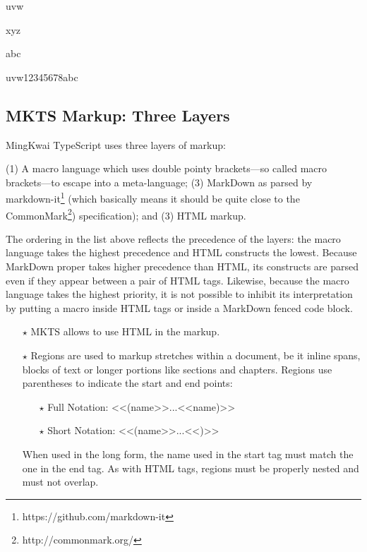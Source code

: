 

uvwxyzabc\mktsShowpar\par
uvw\mktsUp{}12345678\mktsDown{}abc\mktsShowpar\par
\begin{multicols}{2}
\subsection{MKTS Markup: Three Layers
}
MingKwai TypeScript uses three layers of markup:\mktsShowpar\par
(1) A macro language which uses double pointy brackets—so called
  macro brackets—to escape into a meta-language;
(3) MarkDown as parsed by {\mktsStyleCode{}markdown-it}\footnote{https://github.com/markdown-it}
  (which basically means it should be quite close to the
  CommonMark\footnote{http://commonmark.org/}) specification); and
(3) HTML markup.\mktsShowpar\par
The ordering in the list above reflects the precedence of the layers:
the macro language takes the highest precedence and HTML constructs
the lowest. Because MarkDown proper takes higher precedence than
HTML, its constructs are parsed even if they appear between a pair
of HTML tags. Likewise, because the macro language takes the highest
priority, it is not possible to inhibit its interpretation by
putting a macro inside HTML tags or inside a MarkDown fenced code
block.\mktsShowpar\par
\begin{itemize}\item[$\star$] MKTS allows to use {\mktsStyleBold{}HTML} in the markup.\mktsShowpar\par

\item[$\star$] {\mktsStyleBold{}Regions} are used to markup stretches within a document,
be it inline spans, blocks of text or longer portions like
sections and chapters. Regions use parentheses to indicate
the start and end points:\mktsShowpar\par
\begin{itemize}\item[$\star$] Full Notation: {\mktsStyleCode{}<<(name>>...<<name)>>}
\item[$\star$] Short Notation: {\mktsStyleCode{}<<(name>>...<<)>>}
\end{itemize}When used in the long form, the name used in the start tag must
match the one in the end tag. As with HTML
tags, regions must be properly nested and must not overlap.\mktsShowpar\par


\end{itemize}
\end{multicols}
